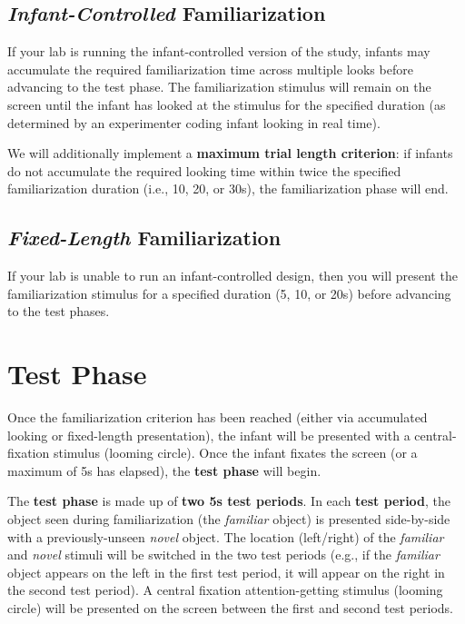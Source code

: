 \documentclass[
  letterpaper,
  DIV=11,
  numbers=noendperiod,
  oneside]{scrreprt}
\begin{document}
\subsection{\texorpdfstring{\emph{Infant-Controlled}
Familiarization}{Infant-Controlled Familiarization}}\label{infant-controlled-familiarization}

If your lab is running the infant-controlled version of the study,
infants may accumulate the required familiarization time across multiple
looks before advancing to the test phase. The familiarization stimulus
will remain on the screen until the infant has looked at the stimulus
for the specified duration (as determined by an experimenter coding
infant looking in real time).

We will additionally implement a \textbf{maximum trial length
criterion}: if infants do not accumulate the required looking time
within twice the specified familiarization duration (i.e., 10, 20, or
30s), the familiarization phase will end.

\subsection{\texorpdfstring{\emph{Fixed-Length}
Familiarization}{Fixed-Length Familiarization}}\label{fixed-length-familiarization}

If your lab is unable to run an infant-controlled design, then you will
present the familiarization stimulus for a specified duration (5, 10, or
20s) before advancing to the test phases.

\section{Test Phase}\label{test-phase}

Once the familiarization criterion has been reached (either via
accumulated looking or fixed-length presentation), the infant will be
presented with a central-fixation stimulus (looming circle). Once the
infant fixates the screen (or a maximum of 5s has elapsed), the
\textbf{test phase} will begin.

The \textbf{test phase} is made up of \textbf{two 5s test periods}. In
each \textbf{test period}, the object seen during familiarization (the
\emph{familiar} object) is presented side-by-side with a
previously-unseen \emph{novel} object. The location (left/right) of the
\emph{familiar} and \emph{novel} stimuli will be switched in the two
test periods (e.g., if the \emph{familiar} object appears on the left in
the first test period, it will appear on the right in the second test
period). A central fixation attention-getting stimulus (looming circle)
will be presented on the screen between the first and second test
periods.
\end{document}
